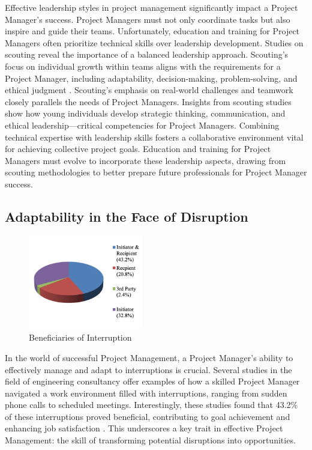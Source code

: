 \documentclass{article}
\begin{document}
Effective leadership styles in project management significantly impact a Project Manager's success. Project Managers must not only coordinate tasks but also inspire and guide their teams. Unfortunately, education and training for Project Managers often prioritize technical skills over leadership development. Studies on scouting reveal the importance of a balanced leadership approach. Scouting's focus on individual growth within teams aligns with the requirements for a Project Manager, including adaptability, decision-making, problem-solving, and ethical judgment \cite{kaluzny2022scouting}. Scouting's emphasis on real-world challenges and teamwork closely parallels the needs of Project Managers. Insights from scouting studies show how young individuals develop strategic thinking, communication, and ethical leadership—critical competencies for Project Managers. Combining technical expertise with leadership skills fosters a collaborative environment vital for achieving collective project goals. Education and training for Project Managers must evolve to incorporate these leadership aspects, drawing from scouting methodologies to better prepare future professionals for Project Manager success.

\subsection{Adaptability in the Face of Disruption}

\begin{figure}[htp]
    \centering
    \includegraphics[width=5cm]{Beneficiaries of Interruption.png}
    \caption{Beneficiaries of Interruption \cite{mordu2016managing}}
    \label{fig:Beneficiaries of Interruption}
\end{figure}

In the world of successful Project Management, a Project Manager's ability to effectively manage and adapt to interruptions is crucial. Several studies in the field of engineering consultancy offer examples of how a skilled Project Manager navigated a work environment filled with interruptions, ranging from sudden phone calls to scheduled meetings. Interestingly, these studies found that 43.2\% of these interruptions proved beneficial, contributing to goal achievement and enhancing job satisfaction \cite{mordu2016managing}. This underscores a key trait in effective Project Management: the skill of transforming potential disruptions into opportunities.
\end{document}
